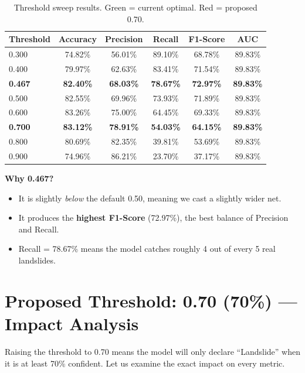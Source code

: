 \documentclass[11pt]{article}
\begin{document}
\begin{table}[H]
\centering
\renewcommand{\arraystretch}{1.2}
\begin{tabular}{lccccc}
\toprule
\textbf{Threshold} & \textbf{Accuracy} & \textbf{Precision} & \textbf{Recall} & \textbf{F1-Score} & \textbf{AUC} \\
\midrule
0.300 & 74.82\% & 56.01\% & 89.10\% & 68.78\% & 89.83\% \\
0.400 & 79.97\% & 62.63\% & 83.41\% & 71.54\% & 89.83\% \\
\rowcolor{bestgreen}
\textbf{0.467} & \textbf{82.40\%} & \textbf{68.03\%} & \textbf{78.67\%} & \textbf{72.97\%} & \textbf{89.83\%} \\
0.500 & 82.55\% & 69.96\% & 73.93\% & 71.89\% & 89.83\% \\
0.600 & 83.26\% & 75.00\% & 64.45\% & 69.33\% & 89.83\% \\
\rowcolor{warnred}
\textbf{0.700} & \textbf{83.12\%} & \textbf{78.91\%} & \textbf{54.03\%} & \textbf{64.15\%} & \textbf{89.83\%} \\
0.800 & 80.69\% & 82.35\% & 39.81\% & 53.69\% & 89.83\% \\
0.900 & 74.96\% & 86.21\% & 23.70\% & 37.17\% & 89.83\% \\
\bottomrule
\end{tabular}
\caption{Threshold sweep results. \colorbox{bestgreen}{Green} = current optimal. \colorbox{warnred}{Red} = proposed 0.70.}
\end{table}

\noindent\textbf{Why 0.467?}
\begin{itemize}[noitemsep]
    \item It is slightly \emph{below} the default 0.50, meaning we cast a slightly wider net.
    \item It produces the \textbf{highest F1-Score} (72.97\%), the best balance of Precision and Recall.
    \item Recall = 78.67\% means the model catches roughly 4 out of every 5 real landslides.
\end{itemize}

\section{Proposed Threshold: 0.70 (70\%) --- Impact Analysis}

Raising the threshold to 0.70 means the model will only declare ``Landslide'' when it is at least 70\% confident.
Let us examine the exact impact on every metric.
\end{document}
